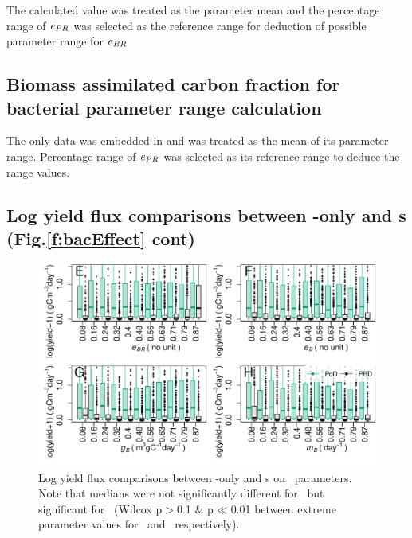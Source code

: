 \documentclass[../thesis.tex]{subfiles} %
\begin{document}
The calculated value was treated as the parameter mean and the percentage range of $e_{PR}$ was selected as the reference range for deduction of possible parameter range for $e_{BR}$

\subsection{Biomass assimilated carbon fraction for bacterial parameter range calculation}
The only data was embedded in \autocite{cochran1988estimation} and was treated as the mean of its parameter range.  Percentage range of $e_{PR}$ was selected as its reference range to deduce the range values.

\subsection{Log yield flux comparisons between \phy-only and \pbs s (Fig.\ref{f:bacEffect} cont)}
\begin{figure}[H]
    \centering
    \includegraphics[width=.95\linewidth]{result/bacEff2.pdf}
    \caption[Log yield flux comparisons between feasible \phy-only and \pbs s (Fig.\ref{f:bacEffect} cont)]{Log yield flux comparisons between \phy-only and \pbs s on \bac\ parameters.  Note that medians were not significantly different for \PoN\ but significant for \PBN\ (Wilcox p$>$0.1 \& p$\ll$0.01 between extreme parameter values for \PoN\ and \PBN\ respectively).\lnExplain}
    \label{f:bacEffect2}
\end{figure}
\end{document}
